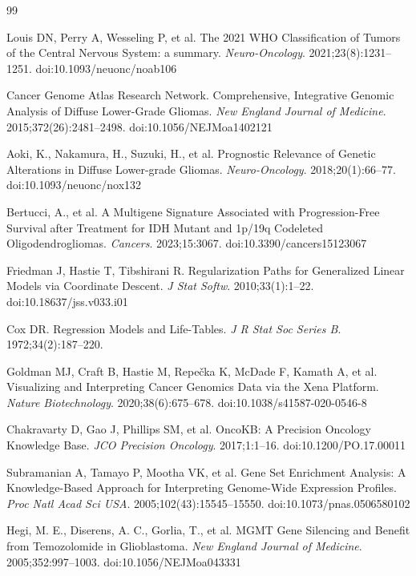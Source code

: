 \documentclass[11pt, letterpaper]{article}
\begin{document}
\begin{thebibliography}{99}

Louis DN, Perry A, Wesseling P, et al.
The 2021 WHO Classification of Tumors of the Central Nervous System: a summary.
\textit{Neuro-Oncology}. 2021;23(8):1231--1251. doi:10.1093/neuonc/noab106

Cancer Genome Atlas Research Network.
Comprehensive, Integrative Genomic Analysis of Diffuse Lower-Grade Gliomas.
\textit{New England Journal of Medicine}. 2015;372(26):2481--2498. doi:10.1056/NEJMoa1402121

Aoki, K., Nakamura, H., Suzuki, H., et al.
Prognostic Relevance of Genetic Alterations in Diffuse Lower-grade Gliomas.
\textit{Neuro-Oncology}. 2018;20(1):66--77. doi:10.1093/neuonc/nox132

Bertucci, A., et al.
A Multigene Signature Associated with Progression-Free Survival after Treatment for IDH Mutant and 1p/19q Codeleted Oligodendrogliomas.
\textit{Cancers}. 2023;15:3067. doi:10.3390/cancers15123067

Friedman J, Hastie T, Tibshirani R.
Regularization Paths for Generalized Linear Models via Coordinate Descent.
\textit{J Stat Softw}. 2010;33(1):1--22. doi:10.18637/jss.v033.i01

Cox DR.
Regression Models and Life-Tables.
\textit{J R Stat Soc Series B}. 1972;34(2):187--220.

Goldman MJ, Craft B, Hastie M, Repečka K, McDade F, Kamath A, et al.
Visualizing and Interpreting Cancer Genomics Data via the Xena Platform.
\textit{Nature Biotechnology}. 2020;38(6):675--678.
doi:10.1038/s41587-020-0546-8

Chakravarty D, Gao J, Phillips SM, et al.
OncoKB: A Precision Oncology Knowledge Base.
\textit{JCO Precision Oncology}. 2017;1:1--16. doi:10.1200/PO.17.00011

Subramanian A, Tamayo P, Mootha VK, et al.
Gene Set Enrichment Analysis: A Knowledge-Based Approach for Interpreting Genome-Wide Expression Profiles.
\textit{Proc Natl Acad Sci USA}. 2005;102(43):15545--15550. doi:10.1073/pnas.0506580102

Hegi, M. E., Diserens, A. C., Gorlia, T., et al.
MGMT Gene Silencing and Benefit from Temozolomide in Glioblastoma.
\textit{New England Journal of Medicine}. 2005;352:997--1003. doi:10.1056/NEJMoa043331


\end{thebibliography}
\end{document}

